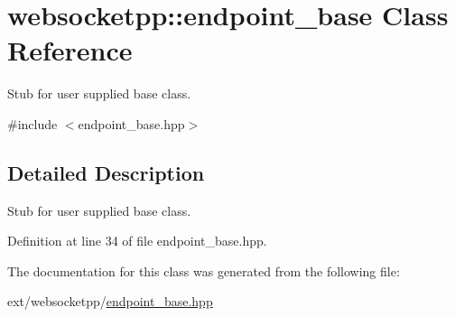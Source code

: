 \hypertarget{classwebsocketpp_1_1endpoint__base}{}\section{websocketpp\+:\+:endpoint\+\_\+base Class Reference}
\label{classwebsocketpp_1_1endpoint__base}


Stub for user supplied base class.  




{\ttfamily \#include $<$endpoint\+\_\+base.\+hpp$>$}



\subsection{Detailed Description}
Stub for user supplied base class. 

Definition at line 34 of file endpoint\+\_\+base.\+hpp.



The documentation for this class was generated from the following file\+:\begin{DoxyCompactItemize}
\item 
ext/websocketpp/\hyperlink{endpoint__base_8hpp}{endpoint\+\_\+base.\+hpp}\end{DoxyCompactItemize}
